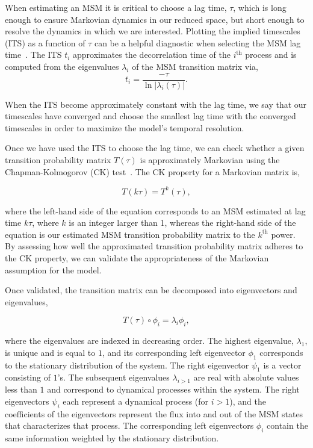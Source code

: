 \documentclass[9pt,tutorial]{livecoms}
\begin{document}
When estimating an MSM it is critical to choose a lag time, $\tau$, which is long enough to ensure Markovian dynamics in our reduced space, but short enough to resolve the dynamics in which we are interested.
Plotting the implied timescales (ITS) as a function of $\tau$ can be a helpful diagnostic when selecting the MSM lag time~\cite{swope-its}.
The ITS $t_i$ approximates the decorrelation time of the $i^\textrm{th}$ process and is computed from the eigenvalues $\lambda_i$ of the MSM transition matrix via,
\begin{equation}
\label{eq:its}
t_i = \frac{-\tau}{\ln\left|\lambda_i(\tau)\right|}.
\end{equation}

\noindent{}When the ITS become approximately constant with the lag time, we say that our timescales have converged and choose the smallest lag time with the converged timescales in order to maximize the model's temporal resolution.

Once we have used the ITS to choose the lag time, we can check whether a given transition probability matrix $T(\tau)$ is approximately Markovian using the Chapman-Kolmogorov (CK) test~\cite{msm-jhp}.
The CK property for a Markovian matrix is,

\begin{equation}
T(k \tau) = T^k(\tau),
\end{equation}

\noindent{}where the left-hand side of the equation corresponds to an MSM estimated at lag time $k\tau$, where $k$ is an integer larger than 1, whereas the right-hand side of the equation is our estimated MSM transition probability matrix to the $k^\textrm{th}$ power.
By assessing how well the approximated transition probability matrix adheres to the CK property, we can validate the appropriateness of the Markovian assumption for the model.

Once validated, the transition matrix can be decomposed into eigenvectors and eigenvalues,

\begin{equation}
\label{eq:transmat}
T(\tau) \circ \phi_i = \lambda_i \phi_i,
\end{equation}

\noindent{}where the eigenvalues are indexed in decreasing order. The highest eigenvalue, $\lambda_1$, is unique and is equal to $1$, and its corresponding left eigenvector $\phi_1$ corresponds to the stationary distribution of the system.
The right eigenvector $\psi_1$ is a vector consisting of $1$'s.
The subsequent eigenvalues $\lambda_{i>1}$ are real with absolute values less than $1$ and correspond to dynamical processes within the system.
The right eigenvectors $\psi_i$ each represent a dynamical process (for $i>1$), and the coefficients of the eigenvectors represent the flux into and out of the MSM states that characterizes that process.
The corresponding left eigenvectors $\phi_i$ contain the same information weighted by the stationary distribution.
\end{document}
